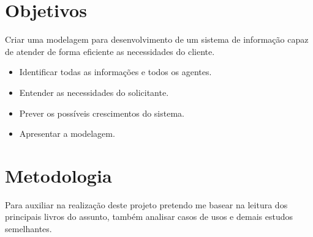 \documentclass[
	12pt,				%
 	oneside,			%
 	openany,
	a4paper,			%
	english,			%
	french,				%
	spanish,			%
	brazil				%
	]{abntex2}
\begin{document}
\chapter{Objetivos}

Criar uma modelagem para desenvolvimento de um sistema de informação capaz de
atender de forma eficiente as necessidades do cliente.

\begin{itemize}
	\item Identificar todas as informações e todos os agentes.
	
	\item Entender as necessidades do solicitante.
	
	\item Prever os possíveis crescimentos do sistema.
	
	\item Apresentar a modelagem.
\end{itemize}

\chapter{Metodologia}

Para auxiliar na realização deste projeto pretendo me basear na leitura dos principais livros do assunto, também analisar casos de usos e demais estudos semelhantes.

\postextual

\end{document}
